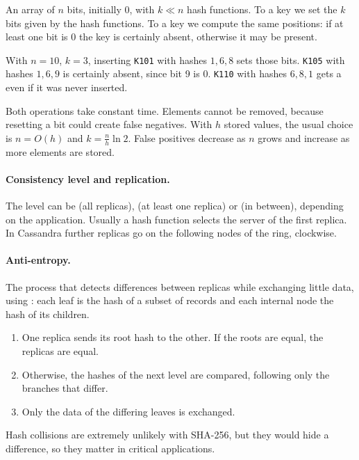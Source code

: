 \begin{definition}
An array of $n$ bits, initially 0, with $k \ll n$ hash functions. To  a key we set the $k$ bits given by the hash functions. To  a key we compute the same positions: if at least one bit is 0 the key is certainly absent, otherwise it may be present.
\end{definition}

\begin{example}
With $n=10$, $k=3$, inserting \texttt{K101} with hashes $1,6,8$ sets those bits. \texttt{K105} with hashes $1,6,9$ is certainly absent, since bit 9 is 0. \texttt{K110} with hashes $6,8,1$ gets a  even if it was never inserted.
\end{example}

Both operations take constant time. Elements cannot be removed, because resetting a bit could create false negatives. With $h$ stored values, the usual choice is $n = O(h)$ and $k = \frac{n}{h}\ln 2$. False positives decrease as $n$ grows and increase as more elements are stored.

\paragraph{Consistency level and replication.} The level can be  (all replicas),  (at least one replica) or  (in between), depending on the application. Usually a hash function selects the server of the first replica. In Cassandra further replicas go on the following nodes of the ring, clockwise.

\paragraph{Anti-entropy.} The process that detects differences between replicas while exchanging little data, using : each leaf is the hash of a subset of records and each internal node the hash of its children.
\begin{enumerate}
  \item One replica sends its root hash to the other. If the roots are equal, the replicas are equal.
  \item Otherwise, the hashes of the next level are compared, following only the branches that differ.
  \item Only the data of the differing leaves is exchanged.
\end{enumerate}
Hash collisions are extremely unlikely with SHA-256, but they would hide a difference, so they matter in critical applications.

